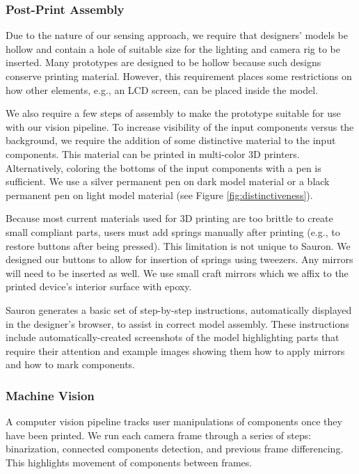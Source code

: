 \subsubsection{Post-Print Assembly}
Due to the nature of our sensing approach, we require that designers' models be hollow and contain a hole of suitable size for the lighting and camera rig to be inserted.  Many prototypes are designed to be hollow because such designs conserve printing material. However, this requirement places some restrictions on how other elements, e.g., an LCD screen, can be placed inside the model.  

We also require a few steps of assembly to make the prototype suitable for use with our vision pipeline.
To increase visibility of the input components versus the background, we require the addition of some distinctive material to the input components. This material can be printed in multi-color 3D printers. Alternatively, coloring the bottoms of the input components with a pen is sufficient.  We use a silver permanent pen on dark model material or a black permanent pen on light model material (see Figure \ref{fig:distinctiveness}).


Because most current materials used for 3D printing are too brittle to create small compliant parts, users must add springs manually after printing (e.g., to restore buttons after being pressed). This limitation is not unique to Sauron. We designed our buttons to allow for insertion of springs using tweezers. Any mirrors will need to be inserted as well.  We use small craft mirrors which we affix to the printed device's interior surface with epoxy.

Sauron generates a basic set of step-by-step instructions, automatically displayed in the designer's browser, to assist in correct model assembly.  These instructions include automatically-created screenshots of the model highlighting parts that require their attention and example images showing them how to apply mirrors and how to mark components.%

\subsubsection{Machine Vision}
A computer vision pipeline tracks user manipulations of components once they have been printed.
We run each camera frame through a series of steps: binarization, connected components detection, and previous frame differencing.  This highlights movement of components between frames.

